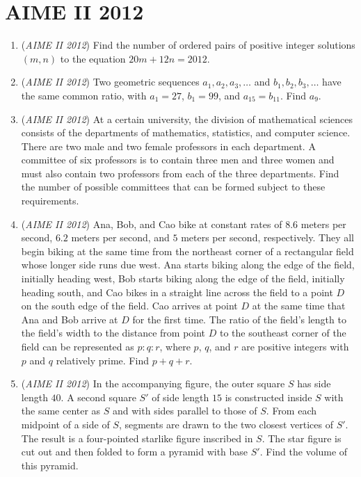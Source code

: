 \section{AIME II 2012}
        \begin{enumerate}
        	\item (\textit{AIME II 2012}) Find the number of ordered pairs of positive integer solutions $(m, n)$ to the equation $20m + 12n = 2012$.


 

	\item (\textit{AIME II 2012}) Two geometric sequences $a_1, a_2, a_3, \ldots$ and $b_1, b_2, b_3, \ldots$ have the same common ratio, with $a_1 = 27$, $b_1=99$, and $a_{15}=b_{11}$. Find $a_9$.


 

	\item (\textit{AIME II 2012}) At a certain university, the division of mathematical sciences consists of the departments of mathematics, statistics, and computer science. There are two male and two female professors in each department. A committee of six professors is to contain three men and three women and must also contain two professors from each of the three departments. Find the number of possible committees that can be formed subject to these requirements.


 

	\item (\textit{AIME II 2012}) Ana, Bob, and Cao bike at constant rates of $8.6$ meters per second, $6.2$ meters per second, and $5$ meters per second, respectively. They all begin biking at the same time from the northeast corner of a rectangular field whose longer side runs due west. Ana starts biking along the edge of the field, initially heading west, Bob starts biking along the edge of the field, initially heading south, and Cao bikes in a straight line across the field to a point $D$ on the south edge of the field. Cao arrives at point $D$ at the same time that Ana and Bob arrive at $D$ for the first time. The ratio of the field's length to the field's width to the distance from point $D$ to the southeast corner of the field can be represented as $p : q : r$, where $p$, $q$, and $r$ are positive integers with $p$ and $q$ relatively prime. Find $p+q+r$.


 

	\item (\textit{AIME II 2012}) In the accompanying figure, the outer square $S$ has side length $40$. A second square $S'$ of side length $15$ is constructed inside $S$ with the same center as $S$ and with sides parallel to those of $S$. From each midpoint of a side of $S$, segments are drawn to the two closest vertices of $S'$. The result is a four-pointed starlike figure inscribed in $S$. The star figure is cut out and then folded to form a pyramid with base $S'$. Find the volume of this pyramid.



\end{enumerate}
